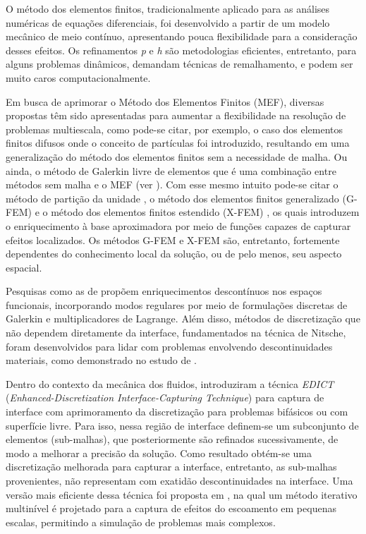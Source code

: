 \documentclass[tese_patricia.tex]{subfiles}
\begin{document}
O método dos elementos finitos, tradicionalmente aplicado para as análises numéricas de equações diferenciais, foi desenvolvido a partir de um modelo mecânico de meio contínuo, apresentando pouca flexibilidade para a consideração desses efeitos. Os refinamentos \textit{p} e \textit{h} são metodologias eficientes, entretanto, para alguns problemas dinâmicos, demandam técnicas de remalhamento, e podem ser muito caros computacionalmente.

Em busca de aprimorar o Método dos Elementos Finitos (MEF), diversas propostas têm sido apresentadas para aumentar a flexibilidade na resolução de problemas multiescala, como pode-se citar, por exemplo, o caso dos elementos finitos difusos \cite{NayrolesTV:1992} onde o conceito de partículas foi introduzido, resultando em uma generalização do método dos elementos finitos sem a necessidade de malha. Ou ainda,  o método de Galerkin livre de elementos que é uma combinação entre métodos sem malha e o MEF (ver ). Com esse mesmo intuito pode-se citar o método de partição da unidade \cite{MelenkB:1996}, o método dos elementos finitos generalizado (G-FEM) \cite{StrouboulisCB:2001} e o método dos elementos finitos estendido (X-FEM) \cite{Moes:2003}, os quais introduzem o enriquecimento à base aproximadora por meio de funções capazes de capturar efeitos localizados. Os métodos G-FEM e X-FEM são, entretanto, fortemente dependentes do conhecimento local da solução, ou de pelo menos, seu aspecto espacial.

Pesquisas como as de  propõem enriquecimentos descontínuos nos espaços funcionais, incorporando modos regulares por meio de formulações discretas de Galerkin e multiplicadores de Lagrange. Além disso, métodos de discretização que não dependem diretamente da interface, fundamentados na técnica de Nitsche, foram desenvolvidos para lidar com problemas envolvendo descontinuidades materiais, como demonstrado no estudo de .

Dentro do contexto da mecânica dos fluidos,  introduziram a técnica \textit{EDICT} (\textit{Enhanced-Discretization Interface-Capturing Technique}) para captura de interface com aprimoramento da discretização para problemas bifásicos ou com superfície livre. Para isso, nessa região de interface definem-se um subconjunto de elementos (sub-malhas), que posteriormente são refinados sucessivamente, de modo a melhorar a precisão da solução. Como resultado obtém-se uma discretização melhorada para capturar a interface, entretanto, as sub-malhas provenientes, não representam com exatidão descontinuidades na interface. Uma versão mais eficiente dessa técnica foi proposta em , na qual um método iterativo multinível é projetado para a captura de efeitos do escoamento em pequenas escalas, permitindo a simulação de problemas mais complexos.
\end{document}
